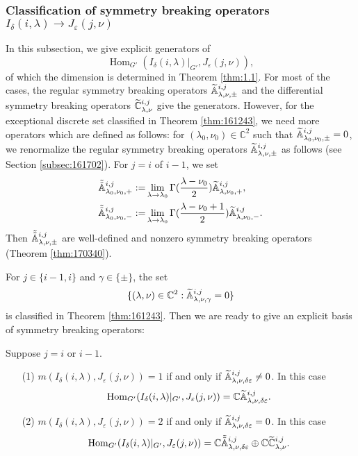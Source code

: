 \subsubsection{Classification of symmetry breaking operators
 $I_{\delta}(i,\lambda) \to J_{\varepsilon}(j,\nu)$}
\label{subsec:SBOthm}
In this subsection,
 we give explicit generators
 of
\[
   {\operatorname{Hom}}_{G'}
   (I_{\delta}(i,\lambda)|_{G'},J_{\varepsilon}(j,\nu)), 
\]
of which the dimension is determined in Theorem \ref{thm:1.1}.  
For most of the cases,
 the regular symmetry breaking operators
 ${\widetilde{\mathbb{A}}}_{{\lambda},{\nu},{\pm}}^{{i,j}}$
 and the differential symmetry breaking operators
 $\widetilde{{\mathbb{C}}}_{{\lambda},{\nu}}^{{i,j}}$ give the generators.  
However,  for the exceptional discrete set classified in Theorem \ref{thm:161243}, 
 we need more operators
 which are defined as follows:
 for $(\lambda_0, \nu_0)\in {\mathbb{C}}^2$
 such that ${\widetilde{\mathbb{A}}}_{{\lambda_0},{\nu_0},{\pm}}^{{i,j}}=0$, 
 we renormalize the regular symmetry breaking operators
 ${\widetilde{\mathbb{A}}}_{{\lambda},{\nu},{\pm}}^{{i,j}}$
 as follows 
 (see Section \ref{subsec:161702}).  
For $j=i$ of $i-1$, 
 we set 
\begin{align}
\label{eqn:Aij+re}
\tilde{\tilde{{\mathbb{A}}}}_{{\lambda_0},{\nu_0},{+}}^{{i,j}}
:=&
\lim_{\lambda \to \lambda_0}
\Gamma(\frac{\lambda-\nu_0}{2})
{\widetilde{\mathbb{A}}}_{{\lambda},{\nu_0},{+}}^{{i,j}},
\\
\label{eqn:Aij+re}
\tilde{\tilde{{\mathbb{A}}}}_{{\lambda_0},{\nu_0},{-}}^{{i, j}}
:=&
\lim_{\lambda \to \lambda_0}
\Gamma(\frac{\lambda-\nu_0+1}{2})
{\widetilde{\mathbb{A}}}_{{\lambda},{\nu_0},{-}}^{{i,j}}.  
\end{align}
Then $\tilde{\tilde{{\mathbb{A}}}}_{{\lambda},{\nu},{\pm}}^{{i,j}}$ are well-defined
 and nonzero symmetry breaking operators
(Theorem \ref{thm:170340}).  



For $j \in \{i-1,i\}$ and $\gamma \in \{\pm\}$, 
 the set
\[
  \{
(\lambda, \nu)\in {\mathbb{C}}^2
:
  {\widetilde{\mathbb{A}}}_{{\lambda},{\nu},{\gamma}}^{{i,j}}=0
\}
\]
 is classified in Theorem \ref{thm:161243}.  
Then we are ready to give an explicit basis
 of symmetry breaking operators:
\begin{theorem}
[generators]
\label{thm:SBObasis}
Suppose $j=i$ or $i-1$.  
\begin{enumerate}
\item[{\rm{(1)}}]
$m(I_{\delta}(i,\lambda),J_{\varepsilon}(j,\nu))=1$
 if and only if
 ${\widetilde{\mathbb{A}}}_{{\lambda},{\nu},{\delta\varepsilon}}^{{i,j}} \ne 0$.  
In this case
\[
   \operatorname{Hom}_{G'}
  (I_{\delta}(i,\lambda)|_{G'},J_{\varepsilon}(j,\nu))
  =
  {\mathbb{C}}{\widetilde{\mathbb{A}}}_{{\lambda},{\nu},{\delta\varepsilon}}^{{i,j}}.  
\]
\item[{\rm{(2)}}]
$m(I_{\delta}(i,\lambda),J_{\varepsilon}(j,\nu))=2$
 if and only if
 ${\widetilde{\mathbb{A}}}_{{\lambda},{\nu},{\delta\varepsilon}}^{{i,j}} = 0$.  
In this case
\[
   \operatorname{Hom}_{G'}
  (I_{\delta}(i,\lambda)|_{G'},J_{\varepsilon}(j,\nu))
  =
  {\mathbb{C}}\tilde{\tilde{{\mathbb{A}}}}_{{\lambda},{\nu},{\delta\varepsilon}}^{{i,j}}
  \oplus
  {\mathbb{C}} \widetilde{{\mathbb{C}}}_{{\lambda},{\nu}}^{{i,j}}.  
\]
\end{enumerate}
\end{theorem}

